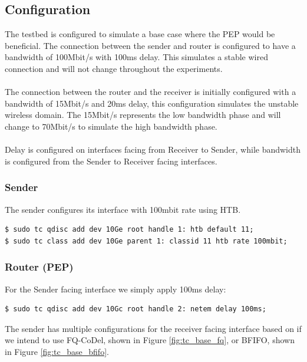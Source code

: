 \documentclass[a4paper,english, 11pt]{report}
\begin{document}
\subsection{Configuration}
The testbed is configured to simulate a base case where the PEP would be beneficial.
The connection between the sender and router is configured to have a bandwidth of 100Mbit/s with 100ms delay. This simulates a stable wired connection and will not change throughout the experiments.\\\\
The connection between the router and the receiver is initially configured with a bandwidth of 15Mbit/s and 20ms delay, this configuration simulates the unstable wireless domain. The 15Mbit/s represents the low bandwidth phase and will change to 70Mbit/s to simulate the high bandwidth phase.\\\\
Delay is configured on interfaces facing from Receiver to Sender, while bandwidth is configured from the Sender to Receiver facing interfaces. 

\subsubsection{Sender}
The sender configures its interface with 100mbit rate using HTB.
\begin{verbatim}
$ sudo tc qdisc add dev 10Ge root handle 1: htb default 11;
$ sudo tc class add dev 10Ge parent 1: classid 11 htb rate 100mbit;
\end{verbatim}

\subsubsection{Router (PEP)}
For the Sender facing interface we simply apply 100ms delay:
\begin{verbatim}
$ sudo tc qdisc add dev 10Gc root handle 2: netem delay 100ms;
\end{verbatim}

The sender has multiple configurations for the receiver facing interface based on if we intend to use FQ-CoDel, shown in Figure \ref{fig:tc_base_fq}, or BFIFO, shown in Figure \ref{fig:tc_base_bfifo}.
\end{document}
